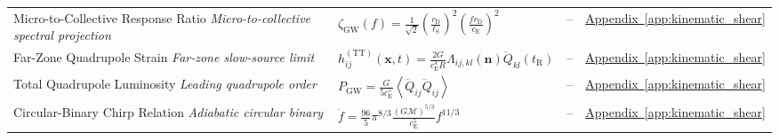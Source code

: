 \begin{longtable}{@{} p{4.5cm} p{6cm} c p{4cm} @{}}
{\raggedright Micro-to-Collective Response Ratio \newline \textit{Micro-to-collective spectral projection}\par} & {\raggedright $\zeta_{\mathrm{GW}}(f) = \frac{1}{\sqrt{2}} \left( \frac{r_{\mathrm{D}}}{\ell_{\mathrm{S}}} \right)^2 \left( \frac{f r_{\mathrm{D}}}{c_{\mathrm{E}}} \right)^2$\par} & -- & {\raggedright \hyperref[app:kinematic_shear]{Appendix~\ref*{app:kinematic_shear}}\par} \\

{\raggedright Far-Zone Quadrupole Strain \newline \textit{Far-zone slow-source limit}\par} & {\raggedright $h_{ij}^{(\mathrm{TT})} (\mathbf{x},t) = \frac{2G}{c_{\mathrm{E}}^4 R} \Lambda_{ij,kl}(\mathbf{n}) \ddot{Q}_{kl} \left( t_{\mathrm{R}} \right)$\par} & -- & {\raggedright \hyperref[app:kinematic_shear]{Appendix~\ref*{app:kinematic_shear}}\par} \\

{\raggedright Total Quadrupole Luminosity \newline \textit{Leading quadrupole order}\par} & {\raggedright $P_{\mathrm{GW}} = \frac{G}{5c_{\mathrm{E}}^5} \left\langle \dddot{Q}_{ij} \dddot{Q}_{ij} \right\rangle$\par} & -- & {\raggedright \hyperref[app:kinematic_shear]{Appendix~\ref*{app:kinematic_shear}}\par} \\

{\raggedright Circular-Binary Chirp Relation \newline \textit{Adiabatic circular binary}\par} & {\raggedright $\dot{f} = \frac{96}{5} \pi^{8/3} \frac{(G\mathcal{M})^{5/3}}{c_{\mathrm{E}}^5} f^{11/3}$\par} & -- & {\raggedright \hyperref[app:kinematic_shear]{Appendix~\ref*{app:kinematic_shear}}\par} \\

\bottomrule
\end{longtable}

